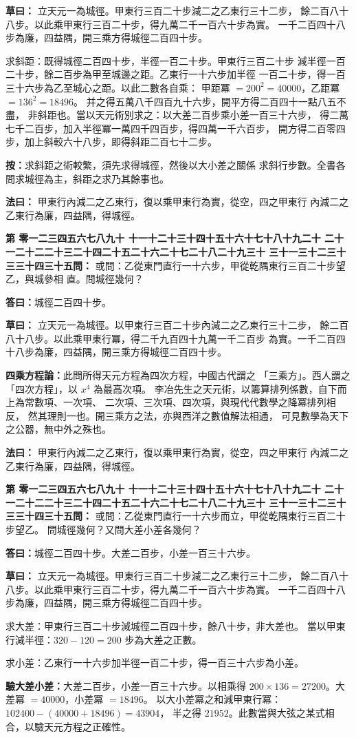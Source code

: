 \documentclass[11pt,a4paper]{article}
\newcounter{probnum}
\newcommand{\chnum}[1]{%
  \ifcase#1 零\or 一\or 二\or 三\or 四\or 五\or 六\or 七\or 八\or 九\or 十\or
    十一\or 十二\or 十三\or 十四\or 十五\or 十六\or 十七\or 十八\or 十九\or 二十\or
    二十一\or 二十二\or 二十三\or 二十四\or 二十五\or 二十六\or 二十七\or 二十八\or 二十九\or 三十\or
    三十一\or 三十二\or 三十三\or 三十四\or 三十五\fi}
\newcommand{\problem}[1]{\stepcounter{probnum}\par\noindent\textbf{第\chnum{\value{probnum}}問：}#1\par\vspace{0.2cm}}
\newcommand{\answer}[1]{\par\noindent\textbf{答曰：}#1\par\vspace{0.2cm}}
\newcommand{\working}[1]{\par\noindent\textbf{草曰：}#1\par\vspace{0.2cm}}
\newcommand{\method}[1]{\par\noindent\textbf{法曰：}#1\par\vspace{0.3cm}}
\begin{document}
\working{
立天元一為城徑。甲東行三百二十步減二之乙東行三十二步，
餘二百八十八步。以此乘甲東行三百二十步，得九萬二千一百六十步為實。
一千二百四十八步為廉，四益隅，開三乘方得城徑二百四十步。

求斜距：既得城徑二百四十步，半徑一百二十步。甲東行三百二十步
減半徑一百二十步，餘二百步為甲至城邊之距。乙東行一十六步加半徑
一百二十步，得一百三十六步為乙至城心之距。以此二數各自乘：
甲距冪 $= 200^2 = 40000$，乙距冪 $= 136^2 = 18496$。
并之得五萬八千四百九十六步，開平方得二百四十一點八五不盡，
非斜距也。當以天元術別求之：以大差二百步乘小差一百三十六步，
得二萬七千二百步，加入半徑冪一萬四千四百步，得四萬一千六百步，
開方得二百零四步，加上斜較六十八步，即得斜距二百七十二步。

\textbf{按：}求斜距之術較繁，須先求得城徑，然後以大小差之關係
求斜行步數。全書各問求城徑為主，斜距之求乃其餘事也。
}

\method{
甲東行內減二之乙東行，復以乘甲東行為實，從空，四之甲東行
內減二之乙東行為廉，四益隅，得城徑。
}

\problem{
或問：乙從東門直行一十六步，甲從乾隅東行三百二十步望乙，與城參相
直。問城徑幾何？
}

\answer{城徑二百四十步。}

\working{
立天元一為城徑。以甲東行三百二十步內減二之乙東行三十二步，
餘二百八十八步。以此乘甲東行冪，得二千九百四十九萬一千二百步
為實。一千二百四十八步為廉，四益隅，開三乘方得城徑二百四十步。

\textbf{四乘方程論：}此問所得天元方程為四次方程，中國古代謂之
「三乘方」。西人謂之「四次方程」，以 $x^4$ 為最高次項。
李冶先生之天元術，以籌算排列係數，自下而上為常數項、一次項、
二次項、三次項、四次項，與現代代數學之降冪排列相反，
然其理則一也。開三乘方之法，亦與西洋之數值解法相通，
可見數學為天下之公器，無中外之殊也。
}

\method{
甲東行內減二之乙東行，復以乘甲東行為實，從空，四之甲東行
內減二之乙東行為廉，四益隅，得城徑。
}

\problem{
或問：乙從東門直行一十六步而立，甲從乾隅東行三百二十步望乙。
問城徑幾何？又問大差小差各幾何？
}

\answer{城徑二百四十步。大差二百步，小差一百三十六步。}

\working{
立天元一為城徑。甲東行三百二十步減二之乙東行三十二步，
餘二百八十八步。以此乘甲東行三百二十步，得九萬二千一百六十步為實。
一千二百四十八步為廉，四益隅，開三乘方得城徑二百四十步。

求大差：甲東行三百二十步減城徑二百四十步，餘八十步，非大差也。
當以甲東行減半徑：$320 - 120 = 200$ 步為大差之正數。

求小差：乙東行一十六步加半徑一百二十步，得一百三十六步為小差。

\textbf{驗大差小差：}大差二百步，小差一百三十六步。以相乘得
$200 \times 136 = 27200$。大差冪 $= 40000$，小差冪 $= 18496$。
以大小差冪之和減甲東行冪：$102400 - (40000 + 18496) = 43904$，
半之得 $21952$。此數當與大弦之某式相合，以驗天元方程之正確性。
}
\end{document}
